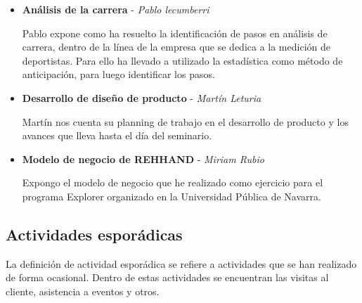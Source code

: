 \begin{itemize}
\begin{itemize}
				\item \textbf{Análisis de la carrera} - \textit{Pablo lecumberri} 
				
				\smallskip
				Pablo expone como ha resuelto la identificación de pasos en análisis de carrera, dentro de la línea de la empresa que se dedica a la medición de deportistas. Para ello ha llevado a utilizado la estadística como método de anticipación, para luego identificar los pasos.			
				\smallskip
				
				\item \textbf{Desarrollo de diseño de producto} - \textit{Martín Leturia} 
				
				\smallskip
				Martín nos cuenta su planning de trabajo en el desarrollo de producto y los avances que lleva hasta el día del seminario. 
				\smallskip
				
				\item \textbf{Modelo de negocio de REHHAND} - \textit{Miriam Rubio} 
				
				\smallskip
				Expongo el modelo de negocio que he realizado como ejercicio para el programa Explorer organizado en la Universidad Pública de Navarra. 
				\smallskip

			\end{itemize}
			
			\medskip	
		\end{itemize}
		
	
		
		
		\subsection{Actividades esporádicas}
		
		La definición de actividad esporádica se refiere a actividades que se han realizado de forma ocasional. Dentro de estas actividades se encuentran las visitas al cliente, asistencia a eventos y otros.
		
